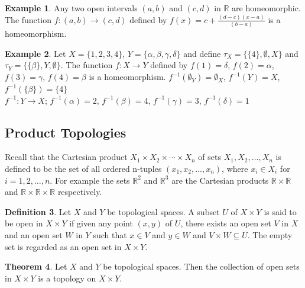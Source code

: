 \documentclass[11pt,a4paper]{article}
\theoremstyle{definition}
\newtheorem{thm}{Theorem}[subsection]
\newtheorem{defn}[thm]{Definition}
\newtheorem{exa}[thm]{Example}
\begin{document}
\begin{exa}
Any two open intervals $(a,b)$ and $(c,d)$ in $\mathbb{R}$ are homeomorphic. The function $f:(a,b)\rightarrow (c,d)$ defined by $f(x)=c+\frac{(d-c)(x-a)}{(b-a)}$ is a homeomorphism.
\end{exa}

\begin{exa}
Let $X=\{1,2,3,4\}$, $Y=\{\alpha,\beta,\gamma,\delta\}$ and define $\tau_X=\{\{4\},\emptyset,X\}$ and $\tau_Y=\{\{\beta\},Y,\emptyset \}$. The function $f:X\rightarrow Y$ defined by $f(1)=\delta$, $f(2)=\alpha$, $f(3)=\gamma$, $f(4)=\beta$ is a homeomorphism. $f^{-1}(\emptyset_Y)=\emptyset_X$, $f^{-1}(Y)=X$, $f^{-1}(\{\beta\})=\{4\}$\\ $f^{-1}:Y\rightarrow X$; $f^{-1}(\alpha)=2$, $f^{-1}(\beta)=4$, $f^{-1}(\gamma)=3$, $f^{-1}(\delta)=1$
\end{exa}




\subsection{Product Topologies}
Recall that the Cartesian product $X_1\times X_2\times\cdots\times X_n$ of sets $X_1,X_2,\ldots,X_n$ is defined to be the set of all ordered n-tuples $(x_1,x_2,\ldots,x_n)$, where $x_i\in X_i$ for $i=1,2,\ldots,n$. For example the sets $\mathbb{R}^2$ and $\mathbb{R}^3$ are the Cartesian products $\mathbb{R}\times \mathbb{R}$ and $\mathbb{R}\times \mathbb{R}\times \mathbb{R}$ respectively.



\begin{defn}
Let $X$ and $Y$ be topological spaces. A subset $U$ of $X\times Y$ is said to be open in $X\times Y$ if given any point $(x,y)$ of $U$, there exists an open set $V$ in $X$ and an open set $W$ in $Y$ such that $x\in V$ and $y\in W$ and $V\times W\subseteq U$. The empty set is regarded as an open set in $X\times Y$.
\end{defn}



\begin{thm}
Let $X$ and $Y$ be topological spaces. Then the collection of open sets in $X\times Y$ is a topology on $X\times Y$.
\end{thm}
\end{document}
